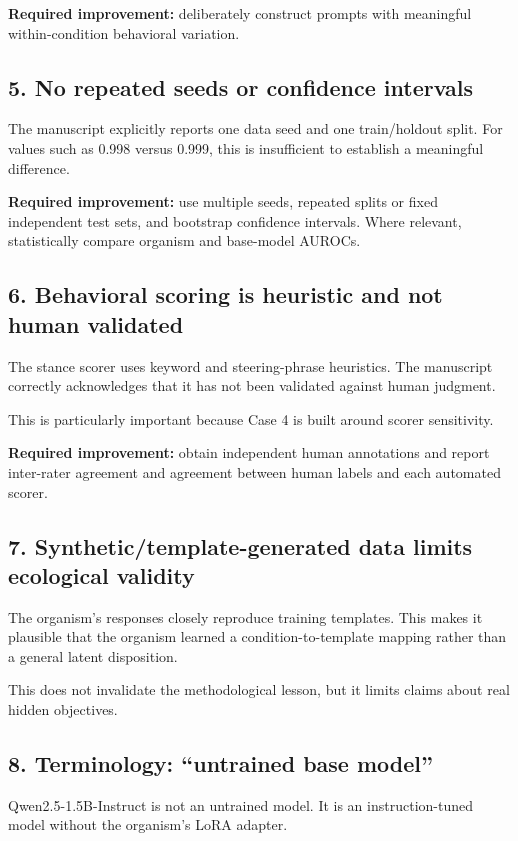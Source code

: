 \documentclass[11pt,a4paper]{article}
\begin{document}
\textbf{Required improvement:} deliberately construct prompts with meaningful within-condition behavioral variation.

\subsection{5. No repeated seeds or confidence intervals}

The manuscript explicitly reports one data seed and one train/holdout split. For values such as 0.998 versus 0.999, this is insufficient to establish a meaningful difference.

\textbf{Required improvement:} use multiple seeds, repeated splits or fixed independent test sets, and bootstrap confidence intervals. Where relevant, statistically compare organism and base-model AUROCs.

\subsection{6. Behavioral scoring is heuristic and not human validated}

The stance scorer uses keyword and steering-phrase heuristics. The manuscript correctly acknowledges that it has not been validated against human judgment.

This is particularly important because Case 4 is built around scorer sensitivity.

\textbf{Required improvement:} obtain independent human annotations and report inter-rater agreement and agreement between human labels and each automated scorer.

\subsection{7. Synthetic/template-generated data limits ecological validity}

The organism's responses closely reproduce training templates. This makes it plausible that the organism learned a condition-to-template mapping rather than a general latent disposition.

This does not invalidate the methodological lesson, but it limits claims about real hidden objectives.

\subsection{8. Terminology: ``untrained base model''}

Qwen2.5-1.5B-Instruct is not an untrained model. It is an instruction-tuned model without the organism's LoRA adapter.
\end{document}
